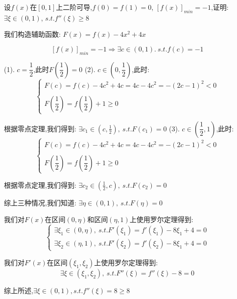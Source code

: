 
\begin{proposition}
	设$f(x)$在$[0,1]$上二阶可导,$f(0)=f(1)=0$, $[f(x)]_{min}=-1$,证明: $\exists \xi\in(0,1)$, $s.t. f''(\xi)\geq 8$
\end{proposition}
\begin{solution}

	我们构造辅助函数:  $F(x)=f(x)-4x^2+4x$

	$$[f(x)]_{min}=-1\Rightarrow \exists c\in(0,1).\ s.t. f(c)=-1$$

	(1). $c=\dfrac{1}{2}$,此时$F(\dfrac{1}{2})=0$
	(2). $c\in(0,\dfrac{1}{2})$,此时:
	$$\left\lbrace
		\begin{array}{l}
			F(c)=f(c)-4c^2+4c=4c-4c^2=-(2c-1)^2<0 \\
			\\
			F(\dfrac{1}{2})=f(\dfrac{1}{2})+1\geq 0
		\end{array}
		\right.
	$$

	根据零点定理,我们得到: $\exists c_{1}\in(c,\frac{1}{2}),\ s.t. F(c_{1})=0$
	(3). $c\in(\dfrac{1}{2},1)$,此时:
	$$\left\lbrace
		\begin{array}{l}
			F(c)=f(c)-4c^2+4c=4c-4c^2=-(2c-1)^2<0 \\
			\\
			F(\dfrac{1}{2})=f(\dfrac{1}{2})+1\geq 0
		\end{array}
		\right.
	$$

	根据零点定理,我们得到: $\exists c_{2}\in(\frac{1}{2},c),\ s.t. F(c_{2})=0$

	综上三种情况,我们知道: $\exists \eta\in(0,1),\ s.t. F(\eta)=0$

	我们对$F(x)$在区间$(0,\eta)$和区间$(\eta,1)$上使用罗尔定理得到:
	$$\left\lbrace
		\begin{array}{l}
			\exists \xi_{1}\in(0,\eta),\ s.t. F'(\xi_{1})=f'(\xi_{1})-8\xi_{1}+4=0 \\
			\exists \xi_{2}\in(\eta,1),\ s.t. F'(\xi_{2})=f'(\xi_{2})-8\xi_{1}+4=0
		\end{array}
		\right. $$

	我们对$F'(x)$在区间$(\xi_{1},\xi_{2})$上使用罗尔定理得到:
	$$\exists \xi\in(\xi_{1},\xi_{2}),\ s.t. F''(\xi)=f''(\xi)-8=0$$

	综上所述,$\exists \xi\in(0,1), s.t. f''(\xi)=8\geq 8$
\end{solution}
